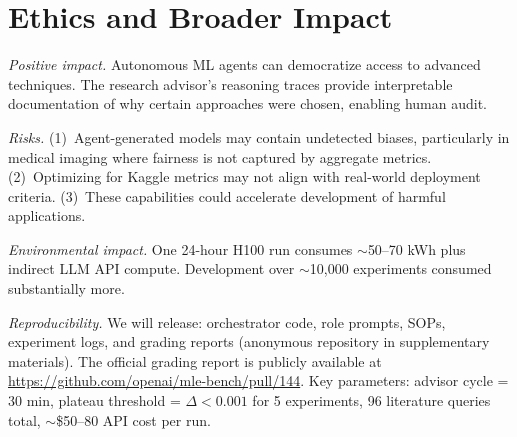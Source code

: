 \documentclass{article}
\begin{document}
\section*{Ethics and Broader Impact}

\emph{Positive impact.} Autonomous ML agents can democratize access to advanced techniques. The research advisor's reasoning traces provide interpretable documentation of why certain approaches were chosen, enabling human audit.

\emph{Risks.} (1)~Agent-generated models may contain undetected biases, particularly in medical imaging where fairness is not captured by aggregate metrics. (2)~Optimizing for Kaggle metrics may not align with real-world deployment criteria. (3)~These capabilities could accelerate development of harmful applications.

\emph{Environmental impact.} One 24-hour H100 run consumes $\sim$50--70 kWh plus indirect LLM API compute. Development over $\sim$10,000 experiments consumed substantially more.

\emph{Reproducibility.} We will release: orchestrator code, role prompts, SOPs, experiment logs, and grading reports (anonymous repository in supplementary materials). The official grading report is publicly available at \url{https://github.com/openai/mle-bench/pull/144}. Key parameters: advisor cycle = 30 min, plateau threshold = $\Delta < 0.001$ for 5 experiments, 96 literature queries total, $\sim$\$50--80 API cost per run.
\end{document}
